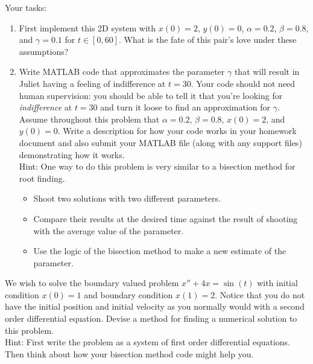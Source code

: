 \begin{problem}
    Your tasks:
    \begin{enumerate}
        \item First implement this 2D system with $x(0) = 2$, $y(0)=0$, $\alpha=0.2$,
            $\beta=0.8$, and $\gamma=0.1$ for $t \in [0,60]$.  What is the fate of this
            pair's love under these assumptions?
        \item Write MATLAB code that approximates the parameter $\gamma$ that will result
            in Juliet having a feeling of indifference at $t=30$.  Your code should not
            need human supervision: you should be able to tell it that you're looking for
            {\it indifference} at $t=30$ and turn it loose to find an approximation for
            $\gamma$.  Assume throughout this problem that $\alpha=0.2$, $\beta=0.8$,
            $x(0)=2$, and $y(0)=0$. Write a description for how your code works in your
            homework document and also submit your MATLAB file (along with any support
            files) demonstrating how it works.
            \\
            Hint: One way to do this problem is very similar to a bisection method for
            root finding. 
            \begin{itemize}
                \item Shoot two solutions with two different parameters.
                \item Compare their results at the desired time against the result of
                    shooting with the average value of the parameter.
                \item Use the logic of the bisection method to make a new estimate of the
                    parameter.
            \end{itemize}
    \end{enumerate}
\end{problem}

\begin{problem}
    We wish to solve the boundary valued problem $x'' + 4x = \sin(t)$ with initial
    condition $x(0)=1$ and boundary condition $x(1)=2$.  Notice that you do not have the
    initial position and initial velocity as you normally would with a second order
    differential equation.  Devise a method for finding a numerical solution to this
    problem. \\
    Hint: First write the problem as a system of first order differential equations.  Then
    think about how your bisection method code might help you.
\end{problem}


